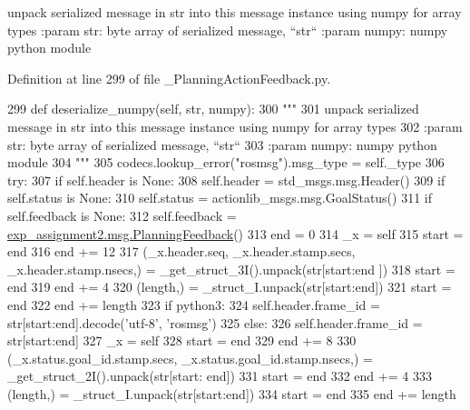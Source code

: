 \begin{DoxyVerb}unpack serialized message in str into this message instance using numpy for array types
:param str: byte array of serialized message, ``str``
:param numpy: numpy python module
\end{DoxyVerb}
 

Definition at line 299 of file \+\_\+\+Planning\+Action\+Feedback.\+py.


\begin{DoxyCode}
299   \textcolor{keyword}{def }deserialize\_numpy(self, str, numpy):
300     \textcolor{stringliteral}{"""}
301 \textcolor{stringliteral}{    unpack serialized message in str into this message instance using numpy for array types}
302 \textcolor{stringliteral}{    :param str: byte array of serialized message, ``str``}
303 \textcolor{stringliteral}{    :param numpy: numpy python module}
304 \textcolor{stringliteral}{    """}
305     codecs.lookup\_error(\textcolor{stringliteral}{"rosmsg"}).msg\_type = self.\_type
306     \textcolor{keywordflow}{try}:
307       \textcolor{keywordflow}{if} self.header \textcolor{keywordflow}{is} \textcolor{keywordtype}{None}:
308         self.header = std\_msgs.msg.Header()
309       \textcolor{keywordflow}{if} self.status \textcolor{keywordflow}{is} \textcolor{keywordtype}{None}:
310         self.status = actionlib\_msgs.msg.GoalStatus()
311       \textcolor{keywordflow}{if} self.feedback \textcolor{keywordflow}{is} \textcolor{keywordtype}{None}:
312         self.feedback = \hyperlink{classexp__assignment2_1_1msg_1_1__PlanningFeedback_1_1PlanningFeedback}{exp\_assignment2.msg.PlanningFeedback}()
313       end = 0
314       \_x = self
315       start = end
316       end += 12
317       (\_x.header.seq, \_x.header.stamp.secs, \_x.header.stamp.nsecs,) = \_get\_struct\_3I().unpack(str[start:end
      ])
318       start = end
319       end += 4
320       (length,) = \_struct\_I.unpack(str[start:end])
321       start = end
322       end += length
323       \textcolor{keywordflow}{if} python3:
324         self.header.frame\_id = str[start:end].decode(\textcolor{stringliteral}{'utf-8'}, \textcolor{stringliteral}{'rosmsg'})
325       \textcolor{keywordflow}{else}:
326         self.header.frame\_id = str[start:end]
327       \_x = self
328       start = end
329       end += 8
330       (\_x.status.goal\_id.stamp.secs, \_x.status.goal\_id.stamp.nsecs,) = \_get\_struct\_2I().unpack(str[start:
      end])
331       start = end
332       end += 4
333       (length,) = \_struct\_I.unpack(str[start:end])
334       start = end
335       end += length

\end{DoxyCode}
